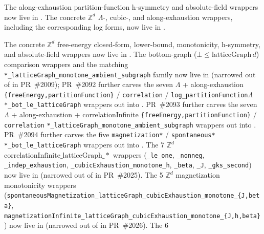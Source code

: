 \documentclass[a4paper,11pt]{article}
\begin{document}
{\raggedright
The along-exhaustion partition-function h-symmetry and absolute-field wrappers
now live in
.
The concrete $\mathbb{Z}^d$ $\Lambda$-, cubic-, and along-exhaustion wrappers,
including the corresponding log forms, now live in
.
\par}

{\raggedright
The concrete $\mathbb{Z}^d$ free-energy closed-form, lower-bound,
monotonicity, h-symmetry, and absolute-field wrappers
now live in
.
The bottom-graph ($\bot \le \mathrm{latticeGraph}\,d$) comparison
wrappers and the matching
\texttt{*\_latticeGraph\_monotone\_ambient\_subgraph} family now live in
(narrowed out of  in PR~\#2009); PR~\#2092 further
carves the seven $\Lambda$ + along-exhaustion
\texttt{\{freeEnergy,partitionFunction\}} / \texttt{correlation} /
\texttt{log\_partitionFunction}$\Lambda$ \texttt{*\_bot\_le\_latticeGraph}
wrappers out into
.
PR~\#2093 further
carves the seven $\Lambda$ + along-exhaustion + correlationInfinite
\texttt{\{freeEnergy,partitionFunction\}} / \texttt{correlation}
\texttt{*\_latticeGraph\_monotone\_ambient\_subgraph}
wrappers out into
.
PR~\#2094 further
carves the five \texttt{magnetization*} / \texttt{spontaneous*}
\texttt{*\_bot\_le\_latticeGraph} wrappers out into
. The 7
$\mathbb{Z}^d$ $\mathrm{correlationInfinite\_latticeGraph\_*}$
wrappers (\texttt{\_le\_one}, \texttt{\_nonneg},
\texttt{\_indep\_exhaustion},
\texttt{\_cubicExhaustion\_monotone\_h}, \texttt{\_beta}, \texttt{\_J},
\texttt{\_gks\_second}) now live in
(narrowed out of  in PR~\#2025). The 5
$\mathbb{Z}^d$ magnetization monotonicity wrappers
(\texttt{spontaneousMagnetization\_latticeGraph\_cubicExhaustion\_monotone\_\{J,beta\}},
\texttt{magnetizationInfinite\_latticeGraph\_cubicExhaustion\_monotone\_\{J,h,beta\}})
now live in
(narrowed out of  in PR~\#2026). The 6
}
\end{document}
